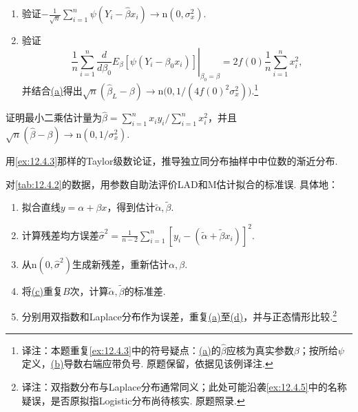 \begin{exercise}\label{exercise:12.27}\leavevmode
\begin{enumerate}[label=(\alph*)]
\item\label{item:12.27.a} 验证$-\frac1{\sqrt n}\sum_{i=1}^n\psi(Y_i-\hat\beta x_i)\to\mathrm n(0,\sigma_x^2)$.
\item\label{item:12.27.b} 验证
$$\left.\frac1n\sum_{i=1}^n\frac d{d\beta_0}E_\beta[\psi(Y_i-\beta_0x_i)]\right|_{\beta_0=\beta}
=2f(0)\frac1n\sum_{i=1}^nx_i^2,$$
并结合\hyperref[item:12.27.a]{(a)}得出$\sqrt n(\hat\beta_L-\beta)\to\mathrm n\bigl(0,1/(4f(0)^2\sigma_x^2)\bigr)$.\footnote{译注：本题重复\autoref{ex:12.4.3}中的符号疑点：\hyperref[item:12.27.a]{(a)}的$\hat\beta$应核为真实参数$\beta$；按所给$\psi$定义，\hyperref[item:12.27.b]{(b)}导数右端应带负号. 原题保留，依据见该例译注.}
\end{enumerate}
\end{exercise}

\begin{exercise}\label{exercise:12.28}
证明最小二乘估计量为$\hat\beta=\sum_{i=1}^nx_iy_i/\sum_{i=1}^nx_i^2$，并且$\sqrt n(\hat\beta-\beta)\to\mathrm n(0,1/\sigma_x^2)$.
\end{exercise}

\begin{exercise}\label{exercise:12.29}
用\autoref{ex:12.4.3}那样的Taylor级数论证，推导独立同分布抽样中中位数的渐近分布.
\end{exercise}

\begin{exercise}\label{exercise:12.30}
对\autoref{tab:12.4.2}的数据，用参数自助法评价LAD和M估计拟合的标准误. 具体地：
\begin{enumerate}[label=(\alph*)]
\item\label{item:12.30.a} 拟合直线$y=\alpha+\beta x$，得到估计$\tilde\alpha,\tilde\beta$.
\item\label{item:12.30.b} 计算残差均方误差$\hat\sigma^2=\frac1{n-2}\sum_{i=1}^n[y_i-(\tilde\alpha+\tilde\beta x_i)]^2$.
\item\label{item:12.30.c} 从$\mathrm n(0,\hat\sigma^2)$生成新残差，重新估计$\alpha,\beta$.
\item\label{item:12.30.d} 将\hyperref[item:12.30.c]{(c)}重复$B$次，计算$\tilde\alpha,\tilde\beta$的标准差.
\item\label{item:12.30.e} 分别用双指数和Laplace分布作为误差，重复\hyperref[item:12.30.a]{(a)}至\hyperref[item:12.30.d]{(d)}，并与正态情形比较.\footnote{译注：双指数分布与Laplace分布通常同义；此处可能沿袭\autoref{ex:12.4.5}中的名称疑误，是否原拟指Logistic分布尚待核实. 原题照录.}
\end{enumerate}
\end{exercise}

